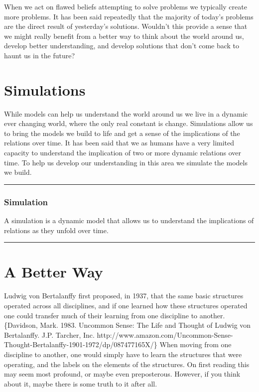 \documentclass[]{memoir}
\begin{document}
When we act on flawed beliefs attempting to solve problems we typically
create more problems. It has been said repeatedly that the majority of
today's problems are the direct result of yesterday's solutions.
Wouldn't this provide a sense that we might really benefit from a better
way to think about the world around us, develop better understanding,
and develop solutions that don't come back to haunt us in the future?

\section{Simulations}

While models can help us understand the world around us we live in a
dynamic ever changing world, where the only real constant is change.
Simulations allow us to bring the models we build to life and get a
sense of the implications of the relations over time. It has been said
that we as humans have a very limited capacity to understand the
implication of two or more dynamic relations over time. To help us
develop our understanding in this area we simulate the models we build.

\begin{center}\rule{3in}{0.4pt}\end{center}

\subsubsection{Simulation}

A simulation is a dynamic model that allows us to understand the
implications of relations as they unfold over time.

\begin{center}\rule{3in}{0.4pt}\end{center}

\section{A Better Way}

Ludwig von Bertalanffy first proposed, in 1937, that the same basic
structures operated across all disciplines, and if one learned how these
structures operated one could transfer much of their learning from one
discipline to another.\{Davidson, Mark. 1983. Uncommon Sense: The Life
and Thought of Ludwig von Bertalanffy. J.P. Tarcher, Inc.
http://www.amazon.com/Uncommon-Sense-Thought-Bertalanffy-1901-1972/dp/087477165X/\}
When moving from one discipline to another, one would simply have to
learn the structures that were operating, and the labels on the elements
of the structures. On first reading this may seem most profound, or
maybe even preposterous. However, if you think about it, maybe there is
some truth to it after all.
\end{document}
